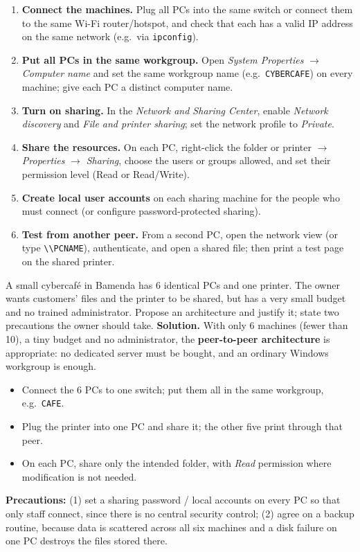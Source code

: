 \documentclass[11pt]{article}
\begin{document}
\begin{methode}
\begin{enumerate}
\item \textbf{Connect the machines.} Plug all PCs into the same switch or connect them to the same Wi-Fi router/hotspot, and check that each has a valid IP address on the same network (e.g.\ via \texttt{ipconfig}).
\item \textbf{Put all PCs in the same workgroup.} Open \emph{System Properties} $\rightarrow$ \emph{Computer name} and set the same workgroup name (e.g.\ \texttt{CYBERCAFE}) on every machine; give each PC a distinct computer name.
\item \textbf{Turn on sharing.} In the \emph{Network and Sharing Center}, enable \emph{Network discovery} and \emph{File and printer sharing}; set the network profile to \emph{Private}.
\item \textbf{Share the resources.} On each PC, right-click the folder or printer $\rightarrow$ \emph{Properties} $\rightarrow$ \emph{Sharing}, choose the users or groups allowed, and set their permission level (Read or Read/Write).
\item \textbf{Create local user accounts} on each sharing machine for the people who must connect (or configure password-protected sharing).
\item \textbf{Test from another peer.} From a second PC, open the network view (or type \texttt{\textbackslash\textbackslash PCNAME}), authenticate, and open a shared file; then print a test page on the shared printer.
\end{enumerate}
\end{methode}

\begin{exoresolu}
A small cybercafé in Bamenda has 6 identical PCs and one printer. The owner wants customers' files and the printer to be shared, but has a very small budget and no trained administrator. Propose an architecture and justify it; state two precautions the owner should take.
\tcblower
\textbf{Solution.} With only 6 machines (fewer than 10), a tiny budget and no administrator, the \textbf{peer-to-peer architecture} is appropriate: no dedicated server must be bought, and an ordinary Windows workgroup is enough.
\begin{itemize}
\item Connect the 6 PCs to one switch; put them all in the same workgroup, e.g.\ \texttt{CAFE}.
\item Plug the printer into one PC and share it; the other five print through that peer.
\item On each PC, share only the intended folder, with \emph{Read} permission where modification is not needed.
\end{itemize}
\textbf{Precautions:} (1) set a sharing password / local accounts on every PC so that only staff connect, since there is no central security control; (2) agree on a backup routine, because data is scattered across all six machines and a disk failure on one PC destroys the files stored there.
\end{exoresolu}
\end{document}

